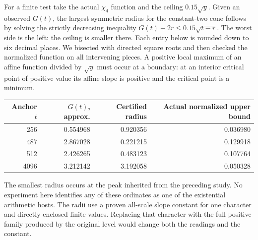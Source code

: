 \documentclass[12pt,letterpaper]{article}
\begin{document}
For a finite test take the actual \(\chi_4\) function and the ceiling \(0.15\sqrt y\). Given an observed \(G(t)\), the largest symmetric radius for the constant-two cone follows by solving the strictly decreasing inequality \(G(t)+2r\le0.15\sqrt{t-r}\). The worst side is the left: the ceiling is smaller there. Each entry below is rounded down to six decimal places. We bisected with directed square roots and then checked the normalized function on all intervening pieces. A positive local maximum of an affine function divided by \(\sqrt y\) must occur at a boundary: at an interior critical point of positive value its affine slope is positive and the critical point is a minimum.
\begin{center}\begin{tabular}{rrrr}\toprule
Anchor \(t\)& \(G(t)\), approx.&Certified radius&Actual normalized upper bound\\\midrule
256&0.554968&0.920356&0.036980\\
487&2.867028&0.221215&0.129918\\
512&2.426265&0.483123&0.107764\\
4096&3.212142&3.192058&0.050328\\\bottomrule
\end{tabular}\end{center}
The smallest radius occurs at the peak inherited from the preceding study. No experiment here identifies any of these ordinates as one of the existential arithmetic hosts. The radii use a proven all-scale slope constant for one character and directly enclosed finite values. Replacing that character with the full positive family produced by the original level would change both the readings and the constant.
\end{document}
